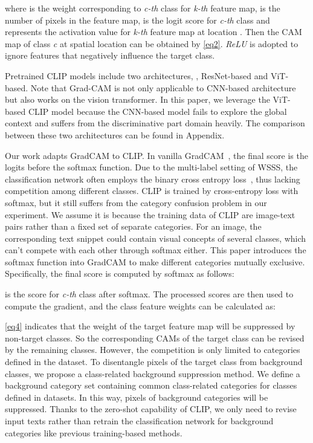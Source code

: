 \documentclass[10pt,twocolumn,letterpaper]{article}
\begin{document}
where  is the weight corresponding to \textit{c-th} class for \textit{k-th} feature map,  is the number of pixels in the feature map,  is the logit score for \textit{c-th} class and  represents the activation value for \textit{k-th} feature map at location . Then the CAM map of class \textit{c} at spatial location  can be obtained by \cref{eq2}. \textit{ReLU} is adopted to ignore features that negatively influence the target class.



Pretrained CLIP models include two architectures, \eg, ResNet-based and ViT-based. Note that Grad-CAM is not only applicable to CNN-based architecture but also works on the vision transformer. In this paper, we leverage the ViT-based CLIP model because the CNN-based model fails to explore the global context and suffers from the discriminative part domain heavily. The comparison between these two architectures can be found in Appendix.


Our work adapts GradCAM to CLIP. In vanilla GradCAM~\cite{gradcam}, the final score is the logits before the softmax function. Due to the multi-label setting of WSSS, the classification network often employs the binary cross entropy loss~\cite{Wang2020SEAM,Wu2021EmbeddedDA}, thus lacking competition among different classes. 
CLIP is trained by cross-entropy loss with softmax, but it still suffers from the category confusion problem in our experiment. We assume it is because the training data of CLIP are image-text pairs rather than a fixed set of separate categories. For an image, the corresponding text snippet could contain visual concepts of several classes, which can't compete with each other through softmax either. This paper introduces the softmax function into GradCAM to make different categories mutually exclusive.
Specifically, the final score is computed by softmax as follows:

 is the score for \textit{c-th} class after softmax. The processed scores are then used to compute the gradient, and the class feature weights can be calculated as:


\cref{eq4} indicates that the weight of the target feature map will be suppressed by non-target classes. So the corresponding CAMs of the target class can be revised by the remaining classes. However, the competition is only limited to categories defined in the dataset. To disentangle pixels of the target class from background classes, we propose a class-related background suppression method. We define a background category set containing  common class-related categories for classes defined in datasets. 
In this way, pixels of background categories will be suppressed. Thanks to the zero-shot capability of CLIP, we only need to revise input texts rather than retrain the classification network for background categories like previous training-based methods.
\end{document}

